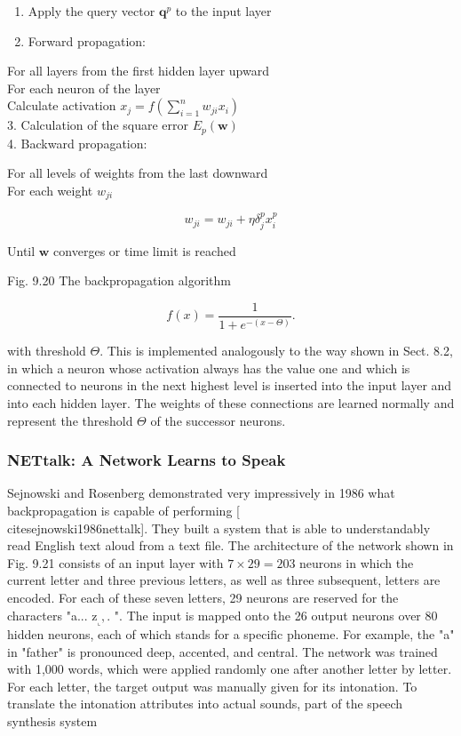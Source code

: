 \documentclass[10pt]{book}
\begin{document}
\begin{enumerate}
  \item Apply the query vector $\boldsymbol{q}^{p}$ to the input layer
  \item Forward propagation:
\end{enumerate}

For all layers from the first hidden layer upward\\
For each neuron of the layer\\
Calculate activation $x_{j}=f\left(\sum_{i=1}^{n} w_{j i} x_{i}\right)$\\
3. Calculation of the square error $E_{p}(\boldsymbol{w})$\\
4. Backward propagation:

For all levels of weights from the last downward\\
For each weight $w_{j i}$

$$
w_{j i}=w_{j i}+\eta \delta_{j}^{p} x_{i}^{p}
$$

Until $\boldsymbol{w}$ converges or time limit is reached

Fig. 9.20 The backpropagation algorithm

$$
f(x)=\frac{1}{1+e^{-(x-\Theta)}} .
$$

with threshold $\Theta$. This is implemented analogously to the way shown in Sect. 8.2, in which a neuron whose activation always has the value one and which is connected to neurons in the next highest level is inserted into the input layer and into each hidden layer. The weights of these connections are learned normally and represent the threshold $\Theta$ of the successor neurons.


\subsubsection*{NETtalk: A Network Learns to Speak}
Sejnowski and Rosenberg demonstrated very impressively in 1986 what backpropagation is capable of performing [\\cite{sejnowski1986nettalk}]. They built a system that is able to understandably read English text aloud from a text file. The architecture of the network shown in Fig. 9.21 consists of an input layer with $7 \times 29=203$ neurons in which the current letter and three previous letters, as well as three subsequent, letters are encoded. For each of these seven letters, 29 neurons are reserved for the characters "a... $\mathrm{z}_{\llcorner },$. ". The input is mapped onto the 26 output neurons over 80 hidden neurons, each of which stands for a specific phoneme. For example, the "a" in "father" is pronounced deep, accented, and central. The network was trained with 1,000 words, which were applied randomly one after another letter by letter. For each letter, the target output was manually given for its intonation. To translate the intonation attributes into actual sounds, part of the speech synthesis system
\end{document}
